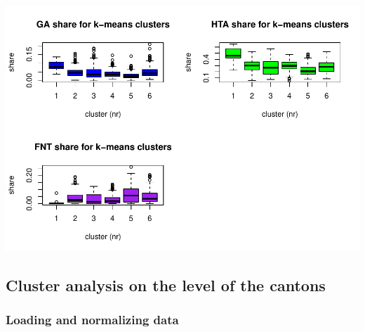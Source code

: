 \documentclass[
]{article}
\begin{document}
\includegraphics{Influence_factors_files/figure-latex/3.14_share_distr_cl_munic-1.pdf}

\hypertarget{cluster-analysis-on-the-level-of-the-cantons}{%
\subsection{Cluster analysis on the level of the
cantons}\label{cluster-analysis-on-the-level-of-the-cantons}}

\hypertarget{loading-and-normalizing-data}{%
\subsubsection{Loading and normalizing
data}\label{loading-and-normalizing-data}}
\end{document}
